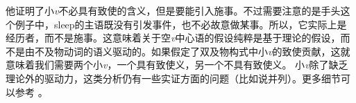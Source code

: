 他证明了小\emph{v}不必具有致使的含义，但是要能引入施事。不过需要注意的是手头这个例子中，sleep的主语既没有引发事件，也不必故意做某事。所以，它实际上是经历者，而不是施事。这意味着关于空\emph{v}中心语的假设纯粹是基于理论的假设，而不是由不及物动词的语义驱动的。如果假定了双及物构式中小\emph{v}的致使贡献，这就意味着我们需要两个小\emph{v}，一个具有致使义，另一个不具有致使义。
%
%
小\emph{v}除了缺乏理论外的驱动力，这类分析仍有一些实证方面的问题（比如说并列）。更多细节可以参考 。


